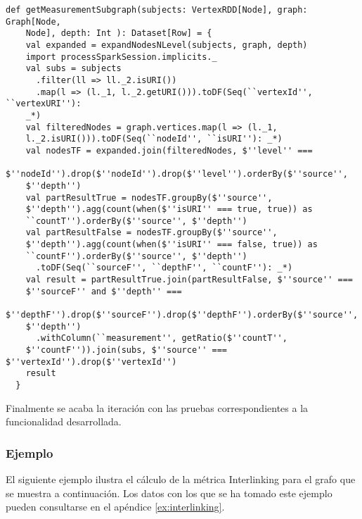 \lstset{escapechar=@,language=scala}
\begin{lstlisting}[caption={Cálculo de la métrica en colección expandida de nodos},captionpos=b, label=graphmetric]
  def getMeasurementSubgraph(subjects: VertexRDD[Node], graph: Graph[Node,
    Node], depth: Int ): Dataset[Row] = {
    val expanded = expandNodesNLevel(subjects, graph, depth)
    import processSparkSession.implicits._
    val subs = subjects
      .filter(ll => ll._2.isURI())
      .map(l => (l._1, l._2.getURI())).toDF(Seq(``vertexId'', ``vertexURI''):
    _*)
    val filteredNodes = graph.vertices.map(l => (l._1,
    l._2.isURI())).toDF(Seq(``nodeId'', ``isURI''): _*)
    val nodesTF = expanded.join(filteredNodes, $''level'' ===
    $''nodeId'').drop($''nodeId'').drop($''level'').orderBy($''source'',
    $''depth'')
    val partResultTrue = nodesTF.groupBy($''source'',
    $''depth'').agg(count(when($''isURI'' === true, true)) as
    ``countT'').orderBy($''source'', $''depth'')
    val partResultFalse = nodesTF.groupBy($''source'',
    $''depth'').agg(count(when($''isURI'' === false, true)) as
    ``countF'').orderBy($''source'', $''depth'')
      .toDF(Seq(``sourceF'', ``depthF'', ``countF''): _*)
    val result = partResultTrue.join(partResultFalse, $''source'' ===
    $''sourceF'' and $''depth'' ===
    $''depthF'').drop($''sourceF'').drop($''depthF'').orderBy($''source'',
    $''depth'')
      .withColumn(``measurement'', getRatio($''countT'',
    $''countF'')).join(subs, $''source'' === $''vertexId'').drop($''vertexId'')
    result
  }
\end{lstlisting}

Finalmente se acaba la iteración con las pruebas correspondientes a la
funcionalidad desarrollada. 


\subsubsection{Ejemplo}

El siguiente ejemplo ilustra el cálculo de la métrica Interlinking para el
grafo que se muestra a continuación. Los datos con los que se ha tomado este
ejemplo pueden consultarse en el apéndice \ref{ex:interlinking}.

